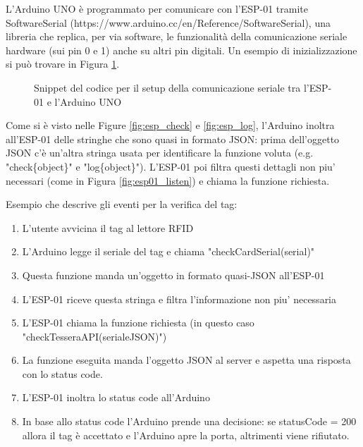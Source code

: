 \documentclass[12pt]{report}
\begin{document}
L'Arduino UNO è programmato per comunicare con l'ESP-01 tramite SoftwareSerial (https://www.arduino.cc/en/Reference/SoftwareSerial), una libreria che replica, per via software, le funzionalità della comunicazione seriale hardware (sui pin 0 e 1) anche su altri pin digitali. Un esempio di inizializzazione si può trovare in Figura \ref{fig:arduino_esp_serial_setup}.


\begin{figure}
	\caption{Snippet del codice per il setup della comunicazione seriale tra l'ESP-01 e l'Arduino UNO}
	\label{fig:arduino_esp_serial_setup}
\end{figure}

Come si è visto nelle Figure \ref{fig:esp_check} e \ref{fig:esp_log}, l'Arduino inoltra all'ESP-01 delle stringhe che sono quasi in formato JSON: prima dell'oggetto JSON c'è un'altra stringa usata per identificare la funzione voluta (e.g. "check\{object\}" e "log\{object\}"). L'ESP-01 poi filtra questi dettagli non piu' necessari (come in Figura \ref{fig:esp01_listen}) e chiama la funzione richiesta.

Esempio che descrive gli eventi per la verifica del tag:

\begin{enumerate}
	\item L'utente avvicina il tag al lettore RFID
	\item L'Arduino legge il seriale del tag e chiama "checkCardSerial(serial)"
	\item Questa funzione manda un'oggetto in formato quasi-JSON all'ESP-01
	\item L'ESP-01 riceve questa stringa e filtra l'informazione non piu' necessaria
	\item L'ESP-01 chiama la funzione richiesta (in questo caso "checkTesseraAPI(serialeJSON)")
	\item La funzione eseguita manda l'oggetto JSON al server e aspetta una risposta con lo status code.
	\item L'ESP-01 inoltra lo status code all'Arduino
	\item In base allo status code l'Arduino prende una decisione: se statusCode = 200 allora il tag è accettato e l'Arduino apre la porta, altrimenti viene rifiutato.
\end{enumerate}
\end{document}
